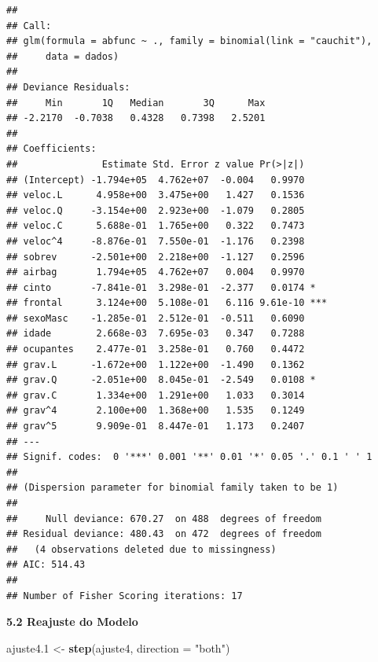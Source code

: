 \documentclass[]{article}
\newenvironment{Shaded}{\begin{snugshade}}{\end{snugshade}}
\newcommand{\KeywordTok}[1]{\textcolor[rgb]{0.13,0.29,0.53}{\textbf{{#1}}}}
\newcommand{\DataTypeTok}[1]{\textcolor[rgb]{0.13,0.29,0.53}{{#1}}}
\newcommand{\FloatTok}[1]{\textcolor[rgb]{0.00,0.00,0.81}{{#1}}}
\newcommand{\StringTok}[1]{\textcolor[rgb]{0.31,0.60,0.02}{{#1}}}
\newcommand{\NormalTok}[1]{{#1}}
\begin{document}
\begin{verbatim}
## 
## Call:
## glm(formula = abfunc ~ ., family = binomial(link = "cauchit"), 
##     data = dados)
## 
## Deviance Residuals: 
##     Min       1Q   Median       3Q      Max  
## -2.2170  -0.7038   0.4328   0.7398   2.5201  
## 
## Coefficients:
##               Estimate Std. Error z value Pr(>|z|)    
## (Intercept) -1.794e+05  4.762e+07  -0.004   0.9970    
## veloc.L      4.958e+00  3.475e+00   1.427   0.1536    
## veloc.Q     -3.154e+00  2.923e+00  -1.079   0.2805    
## veloc.C      5.688e-01  1.765e+00   0.322   0.7473    
## veloc^4     -8.876e-01  7.550e-01  -1.176   0.2398    
## sobrev      -2.501e+00  2.218e+00  -1.127   0.2596    
## airbag       1.794e+05  4.762e+07   0.004   0.9970    
## cinto       -7.841e-01  3.298e-01  -2.377   0.0174 *  
## frontal      3.124e+00  5.108e-01   6.116 9.61e-10 ***
## sexoMasc    -1.285e-01  2.512e-01  -0.511   0.6090    
## idade        2.668e-03  7.695e-03   0.347   0.7288    
## ocupantes    2.477e-01  3.258e-01   0.760   0.4472    
## grav.L      -1.672e+00  1.122e+00  -1.490   0.1362    
## grav.Q      -2.051e+00  8.045e-01  -2.549   0.0108 *  
## grav.C       1.334e+00  1.291e+00   1.033   0.3014    
## grav^4       2.100e+00  1.368e+00   1.535   0.1249    
## grav^5       9.909e-01  8.447e-01   1.173   0.2407    
## ---
## Signif. codes:  0 '***' 0.001 '**' 0.01 '*' 0.05 '.' 0.1 ' ' 1
## 
## (Dispersion parameter for binomial family taken to be 1)
## 
##     Null deviance: 670.27  on 488  degrees of freedom
## Residual deviance: 480.43  on 472  degrees of freedom
##   (4 observations deleted due to missingness)
## AIC: 514.43
## 
## Number of Fisher Scoring iterations: 17
\end{verbatim}

\textbf{5.2 Reajuste do Modelo}

\begin{Shaded}
\begin{Highlighting}[]
\NormalTok{ajuste4}\FloatTok{.1} \NormalTok{<-}\StringTok{ }\KeywordTok{step}\NormalTok{(ajuste4, }\DataTypeTok{direction =} \StringTok{"both"}\NormalTok{)}
\end{Highlighting}
\end{Shaded}
\end{document}
